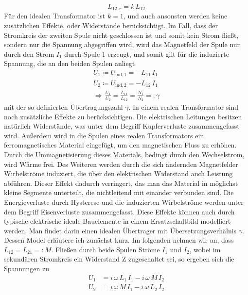 \documentclass[a4paper, 12pt,]{scrartcl}
\begin{document}
$$L_{12,r}=k\,L_{12}$$
Für den idealen Transformator ist $k=1$, und auch ansonsten werden keine zusätzlichen Effekte, oder Widerstände berücksichtigt. Im Fall, dass der Stromkreis der zweiten Spule nicht geschlossen ist und somit kein Strom fließt, sondern nur die Spannung abgegriffen wird, wird das Magnetfeld der Spule nur durch den Strom $I_1$ durch Spule 1 erzeugt, und somit gilt für die induzierte Spannung, die an den beiden Spulen anliegt
\begin{align*}U_1\coloneq{U_{\text{ind},1}}=-L_{11}\,I_1\\
U_2\coloneq{U_{\text{ind},2}}=-L_{12}\,I_1\\
\Rightarrow\,\frac{U_1}{U_2}=\frac{L_{11}}{L_{12}}=\frac{N_1}{N_2}=:\gamma\end{align*}
mit der so definierten Übertragungszahl $\gamma$.\newline
In einem realen Transformator sind noch zusätzliche Effekte zu berücksichtigen. Die elektrischen Leitungen besitzen natürlich Widerstände, was unter dem Begriff Kupferverluste zusammengefasst wird. Außerdem wird in die Spulen eines realen Transformators ein ferromagnetisches Material eingefügt, um den magnetischen Fluss zu erhöhen. Durch die Ummagnetisierung dieses Materials, bedingt durch den Wechselstrom, wird Wärme frei. Des Weiteren werden durch  die sich ändernden Magnetfelder Wirbelströme induziert, die über den elektrischen Widerstand auch Leistung abführen. Dieser Effekt dadurch verringert, das man das Material in möglichst kleine Segmente unterteilt, die nichtleitend mit einander verbunden sind. Die Energieverluste durch Hysterese und die induzierten Wirbelströme werden unter dem Begriff Eisenverluste zusammengefasst.\newline\newline
Diese Effekte können auch durch typische elektrische ideale Bauelemente in einem Ersatzschaltbild modelliert werden. Man findet darin einen idealen Übertrager mit Übersetzungsverhälnis $\gamma$. Dessen Model erläutere ich zunächst kurz. Im folgenden nehmen wir an, dass $L_{12}=L_{21}=:M$. Fließen durch beide Spulen Ströme $I_1$ und $I_2$, wobei im sekundären Stromkreis ein Widerstand Z zugeschaltet sei, so ergeben sich die Spannungen zu
\begin{align}\label{e4}U_1&=i\,\omega\,L_1\,I_1-i\,\omega\,M\,I_2\\
U_2&=i\,\omega\,M\,I_1-i\,\omega\,L_2\,I_2\label{e5}\end{align}
\end{document}

